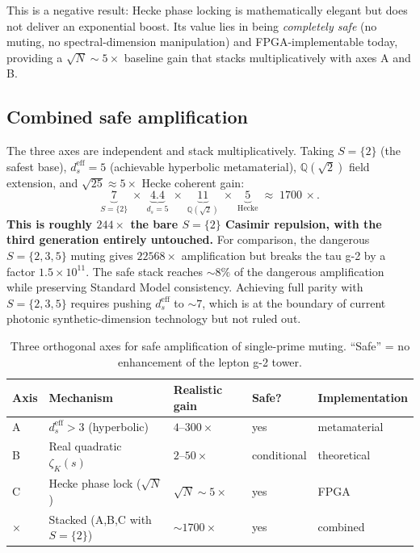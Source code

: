\documentclass[11pt,a4paper]{article}
\begin{document}
This is a negative result: Hecke phase locking is mathematically
elegant but does not deliver an exponential boost. Its value lies
in being \emph{completely safe} (no muting, no spectral-dimension
manipulation) and FPGA-implementable today, providing a
$\sqrt{N}\sim 5\times$ baseline gain that stacks multiplicatively
with axes A and B.

\subsection{Combined safe amplification}
\label{sec:combined}

The three axes are independent and stack multiplicatively. Taking
$S=\{2\}$ (the safest base), $d_s^{\mathrm{eff}}=5$ (achievable
hyperbolic metamaterial), $\mathbb{Q}(\sqrt{2})$ field extension,
and $\sqrt{25}\approx 5\times$ Hecke coherent gain:
\[
\underbrace{7}_{S=\{2\}}\;\times\;
\underbrace{4.4}_{d_s=5}\;\times\;
\underbrace{11}_{\mathbb{Q}(\sqrt 2)}\;\times\;
\underbrace{5}_{\text{Hecke}}
\;\approx\; 1700\,\times.
\]
\textbf{This is roughly $244\times$ the bare $S=\{2\}$ Casimir
repulsion, with the third generation entirely untouched.}
For comparison, the dangerous $S=\{2,3,5\}$ muting gives $22568\times$
amplification but breaks the tau g-2 by a factor $1.5\times 10^{11}$.
The safe stack reaches $\sim 8\%$ of the dangerous amplification
while preserving Standard Model consistency. Achieving full parity
with $S=\{2,3,5\}$ requires pushing $d_s^{\mathrm{eff}}$ to $\sim 7$,
which is at the boundary of current photonic synthetic-dimension
technology but not ruled out.

\begin{table}[h]
\centering
\caption{Three orthogonal axes for safe amplification of single-prime
muting. ``Safe'' = no enhancement of the lepton g-2 tower.}
\label{tab:safe_axes}
\begin{tabular}{@{}lllll@{}}
\toprule
Axis & Mechanism & Realistic gain & Safe? & Implementation \\
\midrule
A & $d_s^{\mathrm{eff}} > 3$ (hyperbolic) & $4$--$300\times$ & yes & metamaterial \\
B & Real quadratic $\zeta_K(s)$ & $2$--$50\times$ & conditional & theoretical \\
C & Hecke phase lock ($\sqrt{N}$) & $\sqrt{N}\sim 5\times$ & yes & FPGA \\
\midrule
$\times$ & Stacked (A,B,C with $S=\{2\}$) & $\sim 1700\times$ & yes & combined \\
\bottomrule
\end{tabular}
\end{table}
\end{document}
